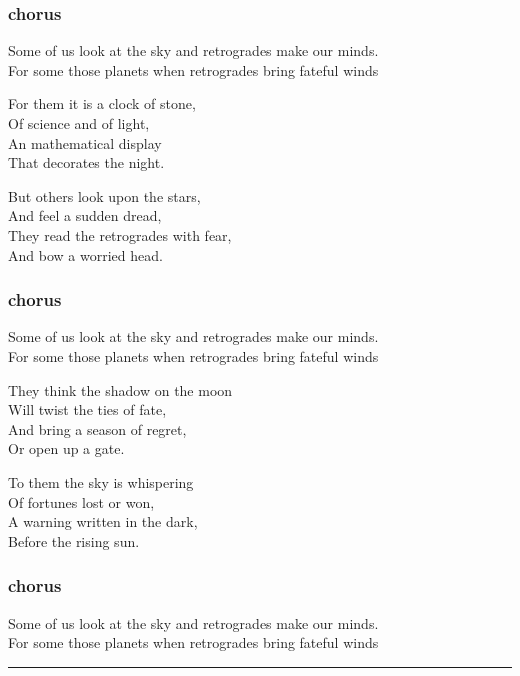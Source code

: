 \subsubsection{chorus}\label{chorus}

Some of us look at the sky and retrogrades make our minds.\\
For some those planets when retrogrades bring fateful winds

For them it is a clock of stone,\\
Of science and of light,\\
An mathematical display\\
That decorates the night.

But others look upon the stars,\\
And feel a sudden dread,\\
They read the retrogrades with fear,\\
And bow a worried head.

\subsubsection{chorus}\label{chorus-1}

Some of us look at the sky and retrogrades make our minds.\\
For some those planets when retrogrades bring fateful winds

They think the shadow on the moon\\
Will twist the ties of fate,\\
And bring a season of regret,\\
Or open up a gate.

To them the sky is whispering\\
Of fortunes lost or won,\\
A warning written in the dark,\\
Before the rising sun.

\subsubsection{chorus}\label{chorus-2}

Some of us look at the sky and retrogrades make our minds.\\
For some those planets when retrogrades bring fateful winds

\begin{center}\rule{0.5\linewidth}{0.5pt}\end{center}

